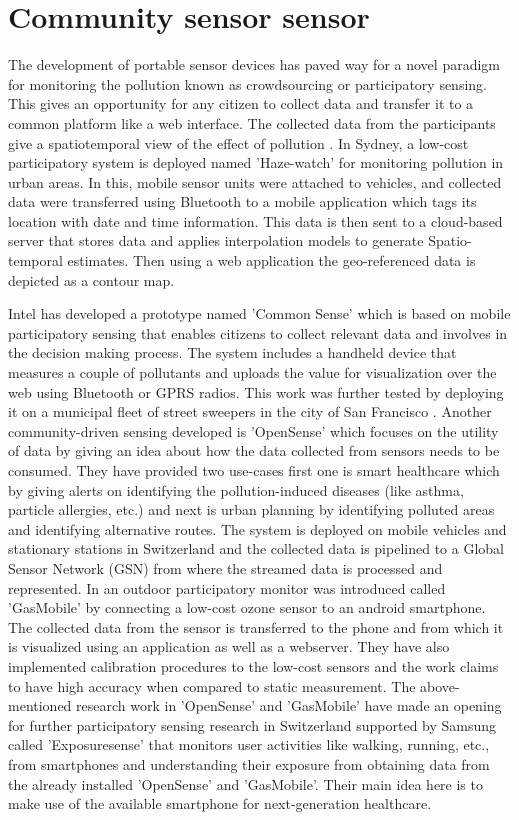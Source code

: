 \section{Community sensor sensor}

The development of portable sensor devices has paved way for a novel paradigm for monitoring the pollution known as crowdsourcing or participatory sensing. This gives an opportunity for any citizen to collect data and transfer it to a common platform like a web interface. The collected data from the participants give a spatiotemporal view of the effect of pollution \cite{Kanhere2013}. In Sydney, a low-cost participatory system is deployed named 'Haze-watch' \cite{Sivaraman2013} for monitoring pollution in urban areas. In this, mobile sensor units were attached to vehicles, and collected data were transferred using Bluetooth to a mobile application which tags its location with date and time information. This data is then sent to a cloud-based server that stores data and applies interpolation models \cite{Liao2006} to generate Spatio-temporal estimates. Then using a web application the geo-referenced data is depicted as a contour map. 
\par
Intel has developed a prototype named 'Common Sense' \cite{Dutta2009} which is based on mobile participatory sensing \cite{Abdelzaher2007} that enables citizens to collect relevant data and involves in the decision making process. The system includes a handheld device that measures a couple of pollutants and uploads the value for visualization over the web using Bluetooth or GPRS radios. This work was further tested by deploying it on a municipal fleet of street sweepers in the city of San Francisco \cite{Aoki2008}. Another community-driven sensing developed is 'OpenSense' \cite{Aberer2010} which focuses on the utility of data by giving an idea about how the data collected from sensors needs to be consumed. They have provided two use-cases first one is smart healthcare which by giving alerts on identifying the pollution-induced diseases (like asthma, particle allergies, etc.) and next is urban planning by identifying polluted areas and identifying alternative routes. The system is deployed on mobile vehicles and stationary stations in Switzerland and the collected data is pipelined to a Global Sensor Network (GSN) from where the streamed data is processed and represented. In \cite{Hasenfratz2012} an outdoor participatory monitor was introduced called 'GasMobile' by connecting a low-cost ozone sensor to an android smartphone. The collected data from the sensor is transferred to the phone and from which it is visualized using an application as well as a webserver. They have also implemented calibration procedures to the low-cost sensors and the work claims to have high accuracy when compared to static measurement. The above-mentioned research work in 'OpenSense' and 'GasMobile' have made an opening for further participatory sensing research in Switzerland supported by Samsung called 'Exposuresense' \cite{Predic2013} that monitors user activities like walking, running, etc., from smartphones and understanding their exposure from obtaining data from the already installed 'OpenSense' and 'GasMobile'. Their main idea here is to make use of the available smartphone for next-generation healthcare.
